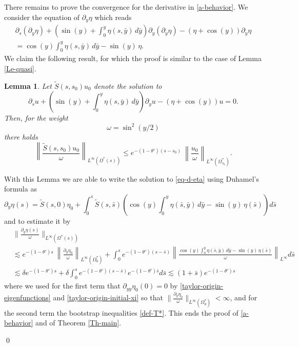 \documentclass[12pt]{amsart}
\numberwithin{equation}{section}
\numberwithin{equation}{section}
\newtheorem{lem}[thm]{Lemma}
\begin{document}
    There remains to prove the convergence for the derivative in \eqref{a-behavior}. We consider the equation of $\partial_y \eta$ which reads
    \begin{multline}\label{eq-d-eta}
    \partial_s (\partial_y \eta) + \left( \sin (y)+\int_0^y\eta(s, \bar{y})\,d\bar{y}      \right) \partial_y (\partial_y \eta)-(\eta+\cos(y))\partial_y \eta\\=\cos(y)\int_0^y\eta(s, \bar{y})\,d\bar{y}-\sin(y)\,\eta.
    \end{multline}
We claim the following result, for which the proof is similar to the case of Lemma \ref{Le-quasi}.
\begin{lem}\label{lemma:quasilinear-derivative}
Let $\tilde S(s,s_0)u_0$ denote the solution to
$$
  \partial_s u + \left( \sin (y)+\int_0^y \eta (s, \bar{y})\,d\bar{y}      \right) \partial_y u -(\eta+\cos(y))u =0.
$$
Then, for the weight
$$
\omega =\sin^2(y/2)
$$
there holds
$$
\left\|\frac{\tilde{S}(s,s_0)u_0}{\omega}\right\|_{L^\infty{(\Omega^*(s))}}\leq  e^{-(1-\theta')(s-s_0)}~
 \left\|\frac{u_0}{\omega}\right\|_{L^\infty{(\Omega^*_{s_0})}}.
$$
\end{lem}
With this Lemma we are able to write the solution to \eqref{eq-d-eta} using Duhamel's formula as
$$
\partial_y \eta(s)= \tilde S(s,0)\eta_0 + \int_0^s \tilde S(s,\bar s)\left(\cos(y)\int_0^y\eta(\bar s, \bar{y})\,d\bar{y}-\sin(y)\,\eta(\bar s)\right)d\bar s
$$
and to estimate it by
\begin{align*}
& \| \frac{\partial_y \eta(s)}{\omega}\|_{L^\infty(\Omega^*(s))} \\ 
& \lesssim e^{-(1-\theta')s}~
 \left\|\frac{\partial_y \eta_0}{\omega}\right\|_{L^\infty{(\Omega_0^*)}} + \int_0^s e^{-(1-\theta')(s-\bar s)}\left\| \frac{\cos(y)\int_0^y\eta(\bar s, \bar{y})\,d\bar{y}-\sin(y)\,\eta(\bar s)}{\omega}\right\|_{L^\infty}d\bar s \\
 & \lesssim \delta e^{-(1-\theta')s}+\delta \int_0^s e^{-(1-\theta')(s-\bar s)} e^{-(1-\theta')\bar s}d\bar s \lesssim (1+\bar s)e^{-(1-\theta')s}
\end{align*}
where we used for the first term that $\partial_{yy} \eta_0(0)=0$ by \eqref{taylor-origin-eigenfunctions} and \eqref{taylor-origin-initial-xi} so that $\|\frac{\partial_y \eta_0}{\omega}\|_{L^\infty{(\Omega_0^*)}}<\infty$, and for the second term the bootstrap inequalities \eqref{def-T*}. This ends the proof of \eqref{a-behavior} and of Theorem \ref{Th-main}.

        \qed
    
\end{document}
